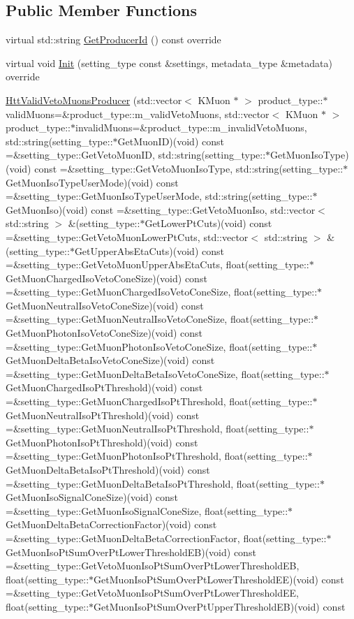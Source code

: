 \subsection*{Public Member Functions}
\begin{DoxyCompactItemize}
\item 
virtual std::string \hyperlink{classHttValidVetoMuonsProducer_a8be5500f8a9a5b7602a77959da458244}{GetProducerId} () const override
\item 
virtual void \hyperlink{classHttValidVetoMuonsProducer_a0eee36cccabefc0d4503017243a0409e}{Init} (setting\_\-type const \&settings, metadata\_\-type \&metadata) override
\item 
\hyperlink{classHttValidVetoMuonsProducer_a7ca92428466a67da2518c2997faf8ca7}{HttValidVetoMuonsProducer} (std::vector$<$ KMuon $\ast$ $>$ product\_\-type::$\ast$validMuons=\&product\_\-type::m\_\-validVetoMuons, std::vector$<$ KMuon $\ast$ $>$ product\_\-type::$\ast$invalidMuons=\&product\_\-type::m\_\-invalidVetoMuons, std::string(setting\_\-type::$\ast$GetMuonID)(void) const =\&setting\_\-type::GetVetoMuonID, std::string(setting\_\-type::$\ast$GetMuonIsoType)(void) const =\&setting\_\-type::GetVetoMuonIsoType, std::string(setting\_\-type::$\ast$GetMuonIsoTypeUserMode)(void) const =\&setting\_\-type::GetMuonIsoTypeUserMode, std::string(setting\_\-type::$\ast$GetMuonIso)(void) const =\&setting\_\-type::GetVetoMuonIso, std::vector$<$ std::string $>$ \&(setting\_\-type::$\ast$GetLowerPtCuts)(void) const =\&setting\_\-type::GetVetoMuonLowerPtCuts, std::vector$<$ std::string $>$ \&(setting\_\-type::$\ast$GetUpperAbsEtaCuts)(void) const =\&setting\_\-type::GetVetoMuonUpperAbsEtaCuts, float(setting\_\-type::$\ast$GetMuonChargedIsoVetoConeSize)(void) const =\&setting\_\-type::GetMuonChargedIsoVetoConeSize, float(setting\_\-type::$\ast$GetMuonNeutralIsoVetoConeSize)(void) const =\&setting\_\-type::GetMuonNeutralIsoVetoConeSize, float(setting\_\-type::$\ast$GetMuonPhotonIsoVetoConeSize)(void) const =\&setting\_\-type::GetMuonPhotonIsoVetoConeSize, float(setting\_\-type::$\ast$GetMuonDeltaBetaIsoVetoConeSize)(void) const =\&setting\_\-type::GetMuonDeltaBetaIsoVetoConeSize, float(setting\_\-type::$\ast$GetMuonChargedIsoPtThreshold)(void) const =\&setting\_\-type::GetMuonChargedIsoPtThreshold, float(setting\_\-type::$\ast$GetMuonNeutralIsoPtThreshold)(void) const =\&setting\_\-type::GetMuonNeutralIsoPtThreshold, float(setting\_\-type::$\ast$GetMuonPhotonIsoPtThreshold)(void) const =\&setting\_\-type::GetMuonPhotonIsoPtThreshold, float(setting\_\-type::$\ast$GetMuonDeltaBetaIsoPtThreshold)(void) const =\&setting\_\-type::GetMuonDeltaBetaIsoPtThreshold, float(setting\_\-type::$\ast$GetMuonIsoSignalConeSize)(void) const =\&setting\_\-type::GetMuonIsoSignalConeSize, float(setting\_\-type::$\ast$GetMuonDeltaBetaCorrectionFactor)(void) const =\&setting\_\-type::GetMuonDeltaBetaCorrectionFactor, float(setting\_\-type::$\ast$GetMuonIsoPtSumOverPtLowerThresholdEB)(void) const =\&setting\_\-type::GetVetoMuonIsoPtSumOverPtLowerThresholdEB, float(setting\_\-type::$\ast$GetMuonIsoPtSumOverPtLowerThresholdEE)(void) const =\&setting\_\-type::GetVetoMuonIsoPtSumOverPtLowerThresholdEE, float(setting\_\-type::$\ast$GetMuonIsoPtSumOverPtUpperThresholdEB)(void) const 
\end{DoxyCompactItemize}
